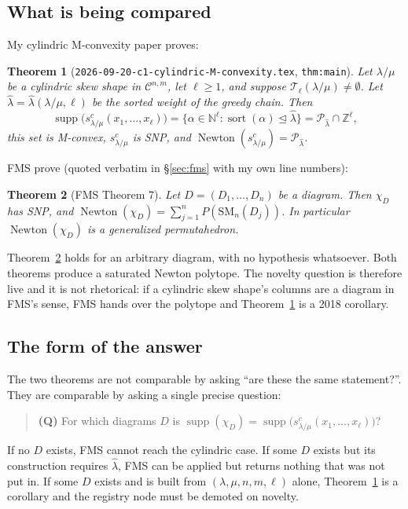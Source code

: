 \documentclass[11pt]{article}
\newtheorem{thm}{Theorem}[section]
\theoremstyle{definition}
\DeclareMathOperator{\supp}{supp}
\DeclareMathOperator{\Newton}{Newton}
\DeclareMathOperator{\sort}{sort}
\newcommand{\Z}{\mathbb{Z}}
\newcommand{\N}{\mathbb{N}}
\newcommand{\cyl}{\mathcal{C}}
\newcommand{\SM}{\mathrm{SM}}
\begin{document}
\subsection{What is being compared}

My cylindric M-convexity paper proves:

\begin{thm}[\texttt{2026-09-20-c1-cylindric-M-convexity.tex}, \texttt{thm:main}]
\label{thm:mine}
Let $\lambda/\mu$ be a cylindric skew shape in $\cyl^{n,m}$, let $\ell\ge1$, and suppose
$\mathcal{T}_\ell(\lambda/\mu)\ne\emptyset$. Let $\hat\lambda=\hat\lambda(\lambda/\mu,\ell)$ be
the sorted weight of the greedy chain. Then
\[
  \supp\bigl(s^{c}_{\lambda/\mu}(x_1,\dots,x_\ell)\bigr)
  =\{\alpha\in\N^{\ell}:\sort(\alpha)\trianglelefteq\hat\lambda\}
  =\mathcal{P}_{\hat\lambda}\cap\Z^{\ell},
\]
this set is M-convex, $s^c_{\lambda/\mu}$ is SNP, and
$\Newton(s^{c}_{\lambda/\mu})=\mathcal{P}_{\hat\lambda}$.
\end{thm}

FMS prove (quoted verbatim in \S\ref{sec:fms} with my own line numbers):

\begin{thm}[FMS Theorem 7]\label{thm:fms}
Let $D=(D_1,\dots,D_n)$ be a diagram. Then $\chi_D$ has SNP, and
$\Newton(\chi_D)=\sum_{j=1}^{n}P(\SM_n(D_j))$. In particular $\Newton(\chi_D)$ is a generalized
permutahedron.
\end{thm}

Theorem~\ref{thm:fms} holds for an arbitrary diagram, with no hypothesis whatsoever. Both
theorems produce a saturated Newton polytope. The novelty question is therefore live and it is
not rhetorical: if a cylindric skew shape's columns are a diagram in FMS's sense, FMS hands over
the polytope and Theorem~\ref{thm:mine} is a 2018 corollary.

\subsection{The form of the answer}

The two theorems are not comparable by asking ``are these the same statement?''. They are
comparable by asking a single precise question:

\begin{quote}
\textbf{(Q)} For which diagrams $D$ is $\supp(\chi_D)=\supp\bigl(s^c_{\lambda/\mu}
(x_1,\dots,x_\ell)\bigr)$?
\end{quote}

If no $D$ exists, FMS cannot reach the cylindric case. If some $D$ exists but its construction
requires $\hat\lambda$, FMS can be applied but returns nothing that was not put in. If some $D$
exists and is built from $(\lambda,\mu,n,m,\ell)$ alone, Theorem~\ref{thm:mine} is a corollary
and the registry node must be demoted on novelty.
\end{document}
